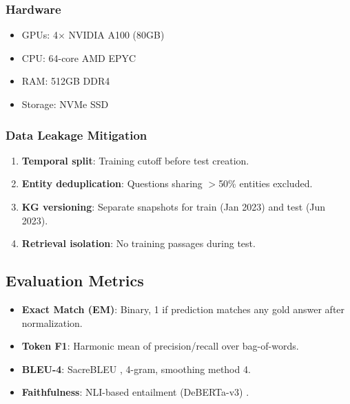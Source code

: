 \documentclass[10pt,twocolumn]{article}
\begin{document}
\subsubsection{Hardware}
\begin{itemize}
    \item GPUs: 4$\times$ NVIDIA A100 (80GB)
    \item CPU: 64-core AMD EPYC
    \item RAM: 512GB DDR4
    \item Storage: NVMe SSD
\end{itemize}

\subsubsection{Data Leakage Mitigation}
\label{sec:leakage}
\begin{enumerate}
    \item \textbf{Temporal split}: Training cutoff before test creation.
    \item \textbf{Entity deduplication}: Questions sharing $>$50\% entities excluded.
    \item \textbf{KG versioning}: Separate snapshots for train (Jan 2023) and test (Jun 2023).
    \item \textbf{Retrieval isolation}: No training passages during test.
\end{enumerate}

\subsection{Evaluation Metrics}

\begin{itemize}
    \item \textbf{Exact Match (EM)}: Binary, 1 if prediction matches any gold answer after normalization.
    \item \textbf{Token F1}: Harmonic mean of precision/recall over bag-of-words.
    \item \textbf{BLEU-4}: SacreBLEU \cite{post2018sacrebleu}, 4-gram, smoothing method 4.
    \item \textbf{Faithfulness}: NLI-based entailment (DeBERTa-v3) \cite{he2016deberta}.
\end{itemize}
\end{document}

